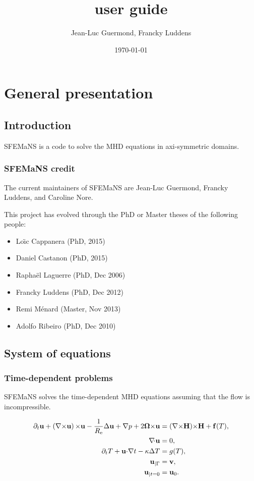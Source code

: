 \documentclass{book}
\title{\sfemans user guide}
\author{Jean-Luc Guermond, Francky Luddens}
\date{\today}
\makeatletter
\newcommand{\sfemans}{SFEMaNS\@\xspace}\newcommand{\petsc}{PETSc\@\xspace}
\makeatother
\begin{document}
\maketitle
\tableofcontents

\chapter{General presentation}

\section{Introduction}
\sfemans is a code to solve the MHD equations in axi-symmetric domains.

\subsection{\sfemans credit}
The current maintainers of \sfemans are Jean-Luc Guermond, Francky
Luddens, and Caroline Nore.

This project has evolved through the PhD or Master theses of the
following people:
\begin{itemize}
\item Lo{\"\i}c Cappanera (PhD, 2015)
\item Daniel Castanon (PhD, 2015)
\item Rapha\"el Laguerre (PhD, Dec 2006)
\item Francky Luddens (PhD, Dec 2012)
\item Remi M\'enard (Master, Nov 2013)
\item Adolfo Ribeiro (PhD, Dec 2010)
\end{itemize}

\section{System of equations}
\subsection{Time-dependent problems}
\sfemans solves the time-dependent MHD equations assuming that the flow
is incompressible.
 
\begin{align*}
\partial_t{\bf u}+\left(\nabla{\times}{\bf u}\right){\times}{\bf u} - \frac{1}{R_{\text{\rm e}}}{\Delta} {\bf u} +\nabla p +
2{\boldsymbol \Omega}{\times}{\bf u} &= (\nabla{\times}{\bf H}){\times} {\bf H} + {\bf f}(T),
\\ \nabla\!{\cdot} {\bf u} &= 0, \\
\partial_t T + {\bf u}{\cdot}\nabla t -\kappa{\Delta} T &= g(T),\\
{\bf u}_{|\Gamma} &= {\bf v} , \\
{\bf u}_{|t=0} &= {\bf u}_0.
\end{align*}
\end{document}
